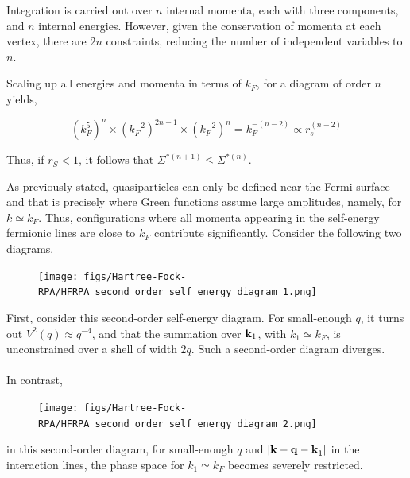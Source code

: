 Integration is carried out over $n$ internal momenta, each with three components, and $n$ internal energies. However, given the conservation of momenta at each vertex, there are $2n$ constraints, reducing the number of independent variables to $n$. 

Scaling up all energies and momenta in terms of $k_F$, for a diagram of order $n$ yields,

\begin{equation}
    (k_F^5)^n \times (k_F^{-2})^{2n-1} \times (k_F^{-2})^{n} = k_F^{-(n-2)} \propto r_s^{(n-2)}
\end{equation}

Thus, if $r_S < 1$, it follows that $\Sigma^{*(n+1)} \leq \Sigma^{*(n)}$.

As previously stated, quasiparticles can only be defined near the Fermi surface and that is precisely where Green functions assume large amplitudes, namely, for $k \simeq k_F$. Thus, configurations where all momenta appearing in the self-energy fermionic lines are close to $k_F$ contribute significantly. Consider the following two diagrams. \\
  
\begin{figure}
\texttt{[image: figs/Hartree-Fock-RPA/HFRPA\_second\_order\_self\_energy\_diagram\_1.png]}
\end{figure} 

First, consider this second-order self-energy diagram. For small-enough $q$, it turns out $V^2(q) \approx {q^{-4}}$, and that the summation over ${\bf k}_1$, with $k_1 \simeq k_F$, is unconstrained over a shell of width $2q$. Such a second-order diagram diverges. \\

\blanky \\

In contrast,

\begin{figure}
\texttt{[image: figs/Hartree-Fock-RPA/HFRPA\_second\_order\_self\_energy\_diagram\_2.png]}
\end{figure} 

in this second-order diagram, for small-enough $q$ and $|{\bf k - q - k}_1|$ in the interaction lines, the phase space for $k_1 \simeq k_F$ becomes severely restricted. \\

\blanky \\

